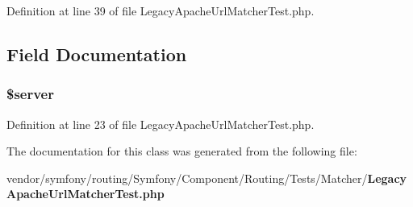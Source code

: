 Definition at line 39 of file Legacy\+Apache\+Url\+Matcher\+Test.\+php.



\subsection{Field Documentation}
\subsubsection[{\$server}]{\setlength{\rightskip}{0pt plus 5cm}\$server\hspace{0.3cm}{\ttfamily [protected]}}\label{class_symfony_1_1_component_1_1_routing_1_1_tests_1_1_matcher_1_1_legacy_apache_url_matcher_test_ad135cc8a47e55f0829949cf62214170f}


Definition at line 23 of file Legacy\+Apache\+Url\+Matcher\+Test.\+php.



The documentation for this class was generated from the following file\+:\begin{DoxyCompactItemize}
\item 
vendor/symfony/routing/\+Symfony/\+Component/\+Routing/\+Tests/\+Matcher/{\bf Legacy\+Apache\+Url\+Matcher\+Test.\+php}\end{DoxyCompactItemize}
